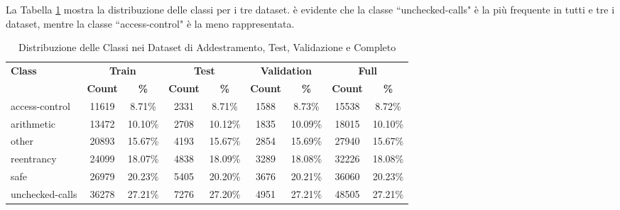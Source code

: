 \documentclass[../../Thesis.tex]{subfiles}
\begin{document}
La Tabella \ref{tab:class_distribution} mostra la distribuzione delle classi per i tre dataset. \`e evidente che la classe ``unchecked-calls" \`e la pi\`u frequente in tutti e tre i dataset, mentre la classe ``access-control" \`e la meno rappresentata.
\begin{table}[h!]
    \centering
    \begin{tabular}{|l|c|c|c|c|c|c|c|c|}
        \hline
        \textbf{Class} & \multicolumn{2}{|c|}{\textbf{Train}} & \multicolumn{2}{|c|}{\textbf{Test}} & \multicolumn{2}{|c|}{\textbf{Validation}} & \multicolumn{2}{|c|}{\textbf{Full}} \\
        \cline{2-9}
        & \textbf{Count} & \textbf{\%} & \textbf{Count} & \textbf{\%} & \textbf{Count} & \textbf{\%} & \textbf{Count} & \textbf{\%} \\
        \hline
        access-control & 11619 & 8.71\% & 2331 & 8.71\% & 1588 & 8.73\% & 15538 & 8.72\% \\
        arithmetic & 13472 & 10.10\% & 2708 & 10.12\% & 1835 & 10.09\% & 18015 & 10.10\% \\
        other & 20893 & 15.67\% & 4193 & 15.67\% & 2854 & 15.69\% & 27940 & 15.67\% \\
        reentrancy & 24099 & 18.07\% & 4838 & 18.09\% & 3289 & 18.08\% & 32226 & 18.08\% \\
        safe & 26979 & 20.23\% & 5405 & 20.20\% & 3676 & 20.21\% & 36060 & 20.23\% \\
        unchecked-calls & 36278 & 27.21\% & 7276 & 27.20\% & 4951 & 27.21\% & 48505 & 27.21\% \\
        \hline
    \end{tabular}
    \caption{Distribuzione delle Classi nei Dataset di Addestramento, Test, Validazione e Completo}
    \label{tab:class_distribution}
\end{table}
\end{document}
